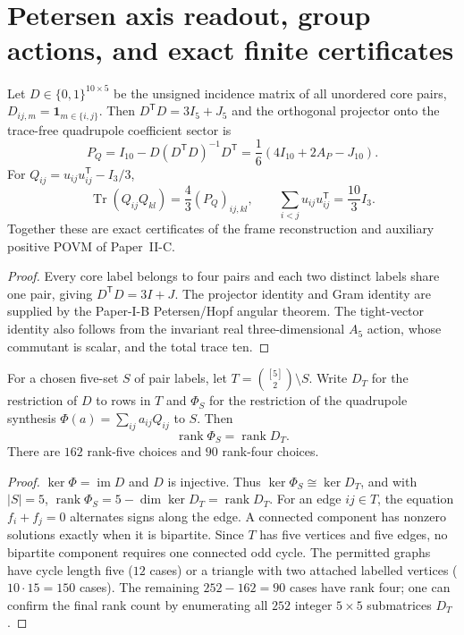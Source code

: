 \documentclass[11pt,a4paper]{article}
\begin{document}
\section{Petersen axis readout, group actions, and exact finite certificates}
\label{p2f:sec:v318-petersen-comparison-certificate}

\begin{proposition}
\label{p2f:prop:v318-ten-axis-matrix-certificate}
Let $D\in\{0,1\}^{10\times5}$ be the unsigned incidence matrix of
all unordered core pairs, $D_{ij,m}=\mathbf1_{m\in\{i,j\}}$.
Then $D^{\mathsf T}D=3I_5+J_5$ and the orthogonal projector onto
the trace-free quadrupole coefficient sector is
\[
 P_Q=I_{10}-D(D^{\mathsf T}D)^{-1}D^{\mathsf T}
     =\frac16(4I_{10}+2A_P-J_{10}).
\]
For $Q_{ij}=u_{ij}u_{ij}^{\mathsf T}-I_3/3$,
\[
 \operatorname{Tr}(Q_{ij}Q_{kl})=\frac43(P_Q)_{ij,kl},
 \qquad \sum_{i<j}u_{ij}u_{ij}^{\mathsf T}=\frac{10}{3}I_3.
\]
Together these are exact certificates of the frame reconstruction
and auxiliary positive POVM of Paper~II-C.
\end{proposition}
\begin{proof}
Every core label belongs to four pairs and each two distinct
labels share one pair, giving $D^{\mathsf T}D=3I+J$.
The projector identity and Gram identity are supplied by the
Paper-I-B Petersen/Hopf angular theorem.  The tight-vector identity
also follows from the invariant real three-dimensional $A_5$ action,
whose commutant is scalar, and the total trace ten.
\end{proof}

\begin{lemma}
\label{p2f:lem:v318-five-probe-count}
For a chosen five-set $S$ of pair labels, let
$T=\binom{[5]}2\setminus S$.  Write $D_T$ for the restriction of $D$
to rows in $T$ and $\Phi_S$ for the restriction of the quadrupole
synthesis $\Phi(a)=\sum_{ij}a_{ij}Q_{ij}$ to $S$.
Then
\[
 \boxed{\operatorname{rank}\Phi_S=\operatorname{rank}D_T.}
\]
There are $162$ rank-five choices and $90$ rank-four choices.
\end{lemma}
\begin{proof}
$\ker\Phi=\operatorname{im}D$ and $D$ is injective.
Thus $\ker\Phi_S\cong\ker D_T$, and with $|S|=5$,
$\operatorname{rank}\Phi_S=5-\dim\ker D_T=\operatorname{rank}D_T$.
For an edge $ij\in T$, the equation $f_i+f_j=0$ alternates signs
along the edge.  A connected component has nonzero solutions
exactly when it is bipartite.  Since $T$ has five vertices and five
edges, no bipartite component requires one connected odd cycle.
The permitted graphs have cycle length five ($12$ cases) or a
triangle with two attached labelled vertices ($10\cdot15=150$
cases).  The remaining $252-162=90$ cases have rank four;
one can confirm the final rank count by enumerating all $252$
integer $5\times5$ submatrices $D_T$.
\end{proof}
\end{document}
